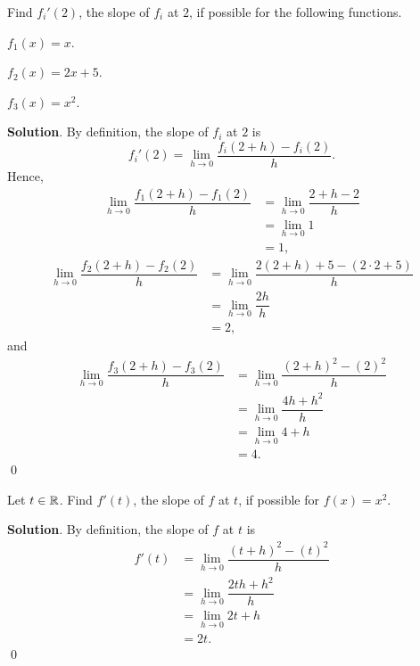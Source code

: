 \documentclass[11pt]{book}
\begin{document}
\begin{example}
    Find ${f_i}'(2)$, the slope of $f_i$ at $2$, if possible for the following functions.
    \begin{enumerate}
        \vspace*{-0.9em}
        \begin{multicols}{3}
            \item $f_1(x)=x$.
            \item $f_2(x)=2x+5$.
            \item $f_3(x)=x^2$.
        \end{multicols}
        \vspace*{0.1em}
    \end{enumerate}
\end{example}
\textbf{Solution}. By definition, the slope of $f_i$ at $2$ is $${f_i}'(2)=\lim_{h\to 0}\dfrac{f_i(2+h)-f_i(2)}{h}.$$ Hence, \begin{align*}
    \lim_{h\to 0}\dfrac{f_1(2+h)-f_1(2)}{h}&=\lim_{h\to 0}\dfrac{2+h-2}{h}\\
    &=\lim_{h\to 0}1\\
    &=1,
\end{align*}
\begin{align*}
    \lim_{h\to 0}\dfrac{f_2(2+h)-f_2(2)}{h}&=\lim_{h\to 0}\dfrac{2(2+h)+5-(2\cdot2+5)}{h}\\
    &=\lim_{h\to 0}\dfrac{2h}{h}\\
    &=2,
\end{align*}
and \begin{align*}
    \lim_{h\to 0}\dfrac{f_3(2+h)-f_3(2)}{h}&=\lim_{h\to 0}\dfrac{(2+h)^2-(2)^2}{h}\\
    &=\lim_{h\to 0}\dfrac{4h+h^2}{h}\\
    &=\lim_{h\to 0}4+h\\
    &=4.
\end{align*} \qed

\begin{example}
    Let $t\in\mathbb{R}$. Find $f'(t)$, the slope of $f$ at $t$, if possible for $f(x)=x^2$.
\end{example}
\textbf{Solution}. By definition, the slope of $f$ at $t$ is \begin{align*}
    f'(t)&=\lim_{h\to 0}\dfrac{(t+h)^2-(t)^2}{h}\\
    &=\lim_{h\to 0}\dfrac{2th+h^2}{h}\\
    &=\lim_{h\to 0}2t+h\\
    &=2t.
\end{align*} \qed
\end{document}
